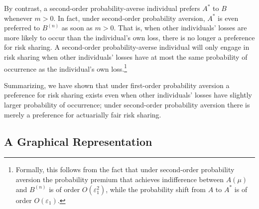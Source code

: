 \documentclass[11pt]{article}
\begin{document}
By contrast, a second-order probability-averse individual prefers $A^{\ast}$ to $B$
whenever $m>0$.
In fact, under second-order probability aversion,
$A^{\ast}$ is even preferred to $B^{(n)}$ as soon as $m>0$.
That is, when other individuals' losses are more likely to occur than the individual's own loss,
there is no longer a preference for risk sharing.
A second-order probability-averse individual will only engage in risk sharing when other individuals' losses
have at most the same probability of occurrence
as the individual's own loss.\footnote{Formally, this follows from the fact that under second-order probability aversion
the probability premium that achieves indifference between $A(\mu)$ and $B^{(n)}$
is of order $O(\varepsilon_{1}^{2})$,
while the probability shift from $A$ to $A^{\ast}$ is of order $O(\varepsilon_{1})$.}

Summarizing, we have shown that
under first-order probability aversion a preference for risk sharing exists even when other individuals' losses have slightly larger probability of occurrence;
under second-order probability aversion there is merely a preference for actuarially fair risk sharing.

\subsection{A Graphical Representation}
\end{document}
